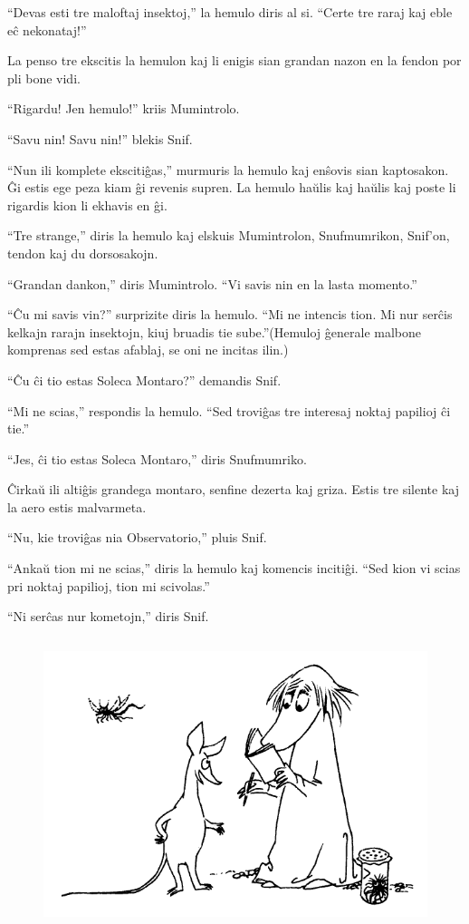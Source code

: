 ``Devas esti tre maloftaj insektoj,'' la hemulo diris al si. ``Certe tre raraj kaj eble eĉ nekonataj!''

La penso tre ekscitis la hemulon kaj li enigis sian grandan nazon en la fendon por pli bone vidi.

``Rigardu! Jen hemulo!'' kriis Mumintrolo.

``Savu nin! Savu nin!'' blekis Snif.

``Nun ili komplete ekscitiĝas,'' murmuris la hemulo kaj enŝovis sian kaptosakon. Ĝi estis ege peza kiam ĝi revenis supren. La hemulo haŭlis kaj haŭlis kaj poste li rigardis kion li ekhavis en ĝi.

``Tre strange,'' diris la hemulo kaj elskuis Mumintrolon, Snufmumrikon, Snif'on, tendon kaj du dorsosakojn.

``Grandan dankon,'' diris Mumintrolo. ``Vi savis nin en la lasta momento.''

``Ĉu mi savis vin?'' surprizite diris la hemulo. ``Mi ne intencis tion. Mi nur serĉis kelkajn rarajn insektojn, kiuj bruadis tie sube.''(Hemuloj ĝenerale malbone komprenas sed estas afablaj, se oni ne incitas ilin.)

``Ĉu ĉi tio estas Soleca Montaro?'' demandis Snif.

``Mi ne scias,'' respondis la hemulo. ``Sed troviĝas tre interesaj noktaj papilioj ĉi tie.''

``Jes, ĉi tio estas Soleca Montaro,'' diris Snufmumriko.

Ĉirkaŭ ili altiĝis grandega montaro, senfine dezerta kaj griza. Estis tre silente kaj la aero estis malvarmeta.

``Nu, kie troviĝas nia Observatorio,'' pluis Snif.

``Ankaŭ tion mi ne scias,'' diris la hemulo kaj komencis incitiĝi. ``Sed kion vi scias pri noktaj papilioj, tion mi scivolas.''

``Ni serĉas nur kometojn,'' diris Snif.

\begin{figure}[htbp]
\centering
\includegraphics[width=349pt,height=241pt]{3-12.png}
\caption{}
\label{3-12}
\end{figure}

